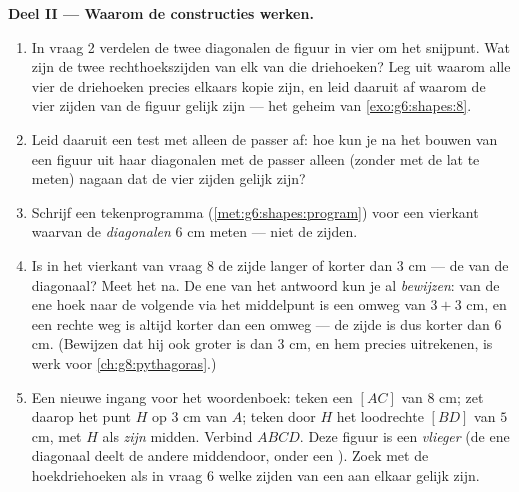 \begin{problem}
\medskip
\noindent\textbf{Deel II --- Waarom de constructies werken.}
\begin{enumerate}[resume]
  \item In vraag 2 verdelen de twee diagonalen de figuur in vier  om het snijpunt. Wat zijn de twee rechthoekszijden van elk
        van die driehoeken? Leg uit waarom alle vier de driehoeken precies
        elkaars kopie zijn, en leid daaruit af waarom de vier zijden van de
        figuur gelijk zijn --- het geheim van \cref{exo:g6:shapes:8}.
  \item Leid daaruit een test met alleen de passer af: hoe kun je na het bouwen
        van een figuur uit haar diagonalen met de passer alleen (zonder met de
        lat te meten) nagaan dat de vier zijden gelijk zijn?
  \item Schrijf een tekenprogramma (\cref{met:g6:shapes:program}) voor een
        vierkant waarvan de \emph{diagonalen} $6$ cm meten --- niet de zijden.
  \item Is in het vierkant van vraag 8 de zijde langer of korter dan $3$ cm ---
        de  van de diagonaal? Meet het na. De ene  van het antwoord
        kun je al \emph{bewijzen}: van de ene hoek naar de volgende via het
        middelpunt is een omweg van $3 + 3$ cm, en een rechte weg is altijd
        korter dan een omweg --- de zijde is dus korter dan $6$ cm. (Bewijzen
        dat hij ook groter is dan $3$ cm, en hem precies uitrekenen, is werk
        voor \cref{ch:g8:pythagoras}.)
  \item Een nieuwe ingang voor het woordenboek: teken een  $[AC]$ van
        $8$ cm; zet daarop het punt $H$ op $3$ cm van $A$; teken door $H$ het
        loodrechte  $[BD]$ van $5$ cm, met $H$ als \emph{zijn} midden.
        Verbind $ABCD$. Deze figuur is een \emph{vlieger} (de
        ene diagonaal deelt de andere middendoor, onder een ). Zoek
        met de hoekdriehoeken als in vraag 6 welke zijden van een  aan
        elkaar gelijk zijn.
\end{enumerate}


\end{problem}
